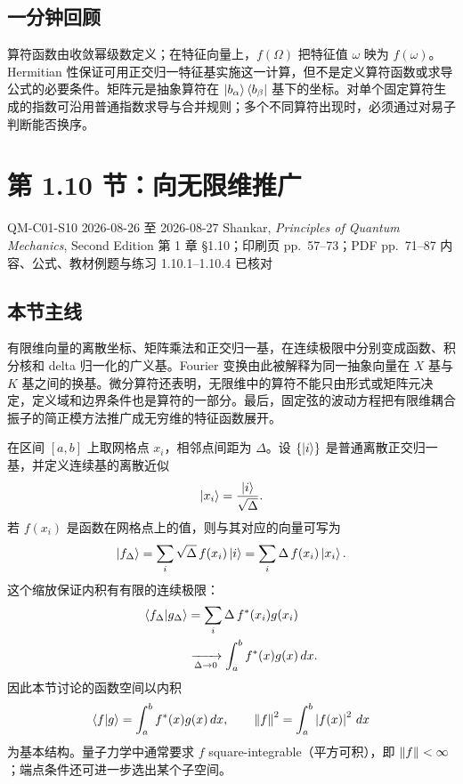 \subsection{一分钟回顾}

算符函数由收敛幂级数定义；在特征向量上，$f(\Omega)$ 把特征值 $\omega$ 映为 $f(\omega)$。Hermitian 性保证可用正交归一特征基实施这一计算，但不是定义算符函数或求导公式的必要条件。矩阵元是抽象算符在 $\left|b_\alpha\right\rangle\left\langle b_\beta\right|$ 基下的坐标。对单个固定算符生成的指数可沿用普通指数求导与合并规则；多个不同算符出现时，必须通过对易子判断能否换序。

\section{第 1.10 节：向无限维推广}
\label{section:QM-C01-S10}

\studymeta
  {QM-C01-S10}
  {2026-08-26 至 2026-08-27}
  {Shankar, \textit{Principles of Quantum Mechanics}, Second Edition}
  {第 1 章 \S 1.10；印刷页 pp.~57--73；PDF pp.~71--87}
  {内容、公式、教材例题与练习 1.10.1--1.10.4 已核对}

\subsection{本节主线}

有限维向量的离散坐标、矩阵乘法和正交归一基，在连续极限中分别变成函数、积分核和 delta 归一化的广义基。Fourier 变换由此被解释为同一抽象向量在 $X$ 基与 $K$ 基之间的换基。微分算符还表明，无限维中的算符不能只由形式或矩阵元决定，定义域和边界条件也是算符的一部分。最后，固定弦的波动方程把有限维耦合振子的简正模方法推广成无穷维的特征函数展开。


在区间 $[a,b]$ 上取网格点 $x_i$，相邻点间距为 $\Delta$。设 $\{\left|i\right\rangle\}$ 是普通离散正交归一基，并定义连续基的离散近似
\begin{equation}
  \left|x_i\right\rangle=\frac{\left|i\right\rangle}{\sqrt{\Delta}}.
  \label{eq:QM-C01-S10-lattice-basis-scaling}
\end{equation}
若 $f(x_i)$ 是函数在网格点上的值，则与其对应的向量可写为
\begin{equation}
  \left|f_\Delta\right\rangle
  =\sum_i\sqrt{\Delta}\,f(x_i)\left|i\right\rangle
  =\sum_i\Delta\,f(x_i)\left|x_i\right\rangle.
  \label{eq:QM-C01-S10-discrete-function-ket}
\end{equation}
这个缩放保证内积有有限的连续极限：
\begin{align}
  \left\langle f_\Delta \middle| g_\Delta \right\rangle
  &=\sum_i\Delta\,f^*(x_i)g(x_i) \\
  &\xrightarrow[\Delta\to0]{}
  \int_a^b f^*(x)g(x)\,dx.
  \label{eq:QM-C01-S10-continuum-inner-product}
\end{align}
因此本节讨论的函数空间以内积
\begin{equation}
  \left\langle f \middle| g \right\rangle=\int_a^b f^*(x)g(x)\,dx,
  \qquad
  \left\lVert f \right\rVert^2=\int_a^b\left|f(x)\right|^2\,dx
  \label{eq:QM-C01-S10-function-inner-product}
\end{equation}
为基本结构。量子力学中通常要求 $f$ square-integrable（平方可积），即 $\left\lVert f \right\rVert<\infty$；端点条件还可进一步选出某个子空间。

